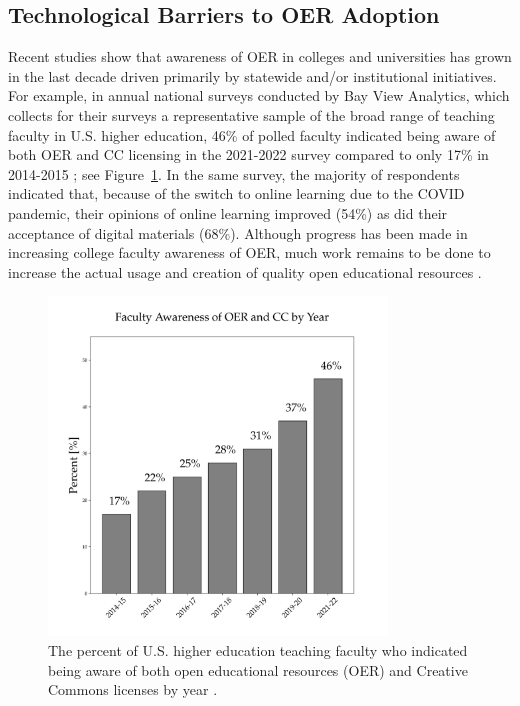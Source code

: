 \documentclass[11pt]{article}
\begin{document}
\subsection{Technological Barriers to OER Adoption}
Recent studies show that awareness of OER in colleges and universities has grown in the last decade driven primarily by statewide and/or institutional initiatives.  For example, in annual national surveys conducted by Bay View Analytics, which collects for their surveys a representative sample of the broad range of teaching faculty in U.S. higher education, 46\% of polled faculty indicated being aware of both OER and CC licensing in the 2021-2022 survey compared to only 17\% in 2014-2015 \cite{JS-JS:2022}; see Figure~\ref{fig:oer-awareness}.  In the same survey, the majority of respondents indicated that, because of the switch to online learning due to the COVID pandemic, their opinions of online learning improved (54\%) as did their acceptance of digital materials (68\%).  Although progress has been made in increasing college faculty awareness of OER, much work remains to be done to increase the actual usage and creation of quality open educational resources \cite{MB:2022, flvc2022}.
\begin{figure}[t]
\centering
\includegraphics[width=90mm]{oer_awareness.png}
\caption{The percent of U.S. higher education teaching faculty who indicated being aware of both open educational resources (OER) and Creative Commons licenses by year \cite{JS-JS:2022}.}
\label{fig:oer-awareness}
\end{figure}
\end{document}
